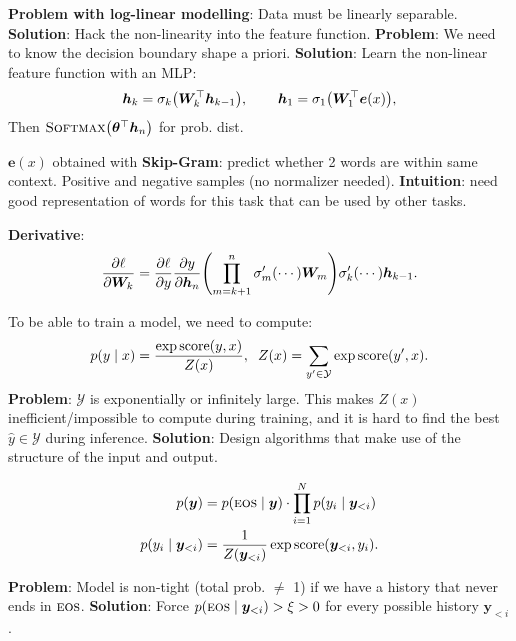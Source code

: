\documentclass{article}
\def\score{\mathrm{score}}
\def\softmax{\textsc{Softmax}}
\def\eos{\textsc{eos}}
\newcommand{\lft}{\mathopen{}\left}
\newcommand{\rgt}{\aftergroup\mathclose\aftergroup{\aftergroup}\right}
\newenvironment{topic}[1]
{\begin{tcolorbox}[
  title=#1,
  breakable,
  colback=white,
  colframe=black,
  fonttitle={\bfseries\sffamily},
  sharp corners,
  boxrule=0.5pt,
  boxsep=0.1cm,
  top=0cm,
  bottom=0cm,
  left=0.1cm,
  right=0.1cm,
  enhanced jigsaw,
]}
{\end{tcolorbox}}
\begin{document}
\begin{multicols}{3}
\begin{topic}{Multi-layer perceptron}
  \textbf{Problem with log-linear modelling}: Data must be linearly separable.
  \textbf{Solution}: Hack the non-linearity into the feature function.
  \textbf{Problem}: We need to know the decision boundary shape a priori.
  \textbf{Solution}: Learn the non-linear feature function with an MLP: \[
    \bm{h}_k = \sigma_k \lft( \bm{W}_k^\top \bm{h}_{k-1} \rgt), \hspace{0.75cm} \bm{h}_1 = \sigma_1 \lft( \bm{W}_1^\top \bm{e}(x) \rgt)
  ,\]
  Then $\softmax \lft( \bm{\theta}^\top \bm{h}_n \rgt)$ for prob. dist.

  $\bm{e}(x)$ obtained with \textbf{Skip-Gram}: predict whether 2 words are
  within same context. Positive and negative samples (no normalizer needed).
  \textbf{Intuition}: need good representation of words for this task that can be used
  by other tasks.

  \textbf{Derivative}: \[
    \pdv{\ell}{\bm{W}_k} = \pdv{\ell}{y} \pdv{y}{\bm{h}_n} \lft( \prod_{m=k+1}^n \sigma_m'(\cdots) \bm{W}_m \rgt) \sigma_k'(\cdots) \bm{h}_{k-1}
  .\]
\end{topic}

\begin{topic}{Structured prediction}
  To be able to train a model, we need to compute: \[
    p(y\mid x) = \frac{\exp \score(y, x)}{Z(x)}, \hspace{0.2cm} Z(x) = \sum_{y' \in \mathcal{Y}} \exp \score(y',x)
  .\]
  \textbf{Problem}: $\mathcal{Y}$ is exponentially or infinitely large. This
  makes $Z(x)$ inefficient/impossible to compute during training, and it is
  hard to find the best $\hat{y}\in\mathcal{Y}$ during inference.
  \textbf{Solution}: Design algorithms that make use of the structure of the
  input and output.
\end{topic}

\begin{topic}{Language modelling}
  \begin{align*}
    p(\bm{y}) &= p(\eos \mid \bm{y}) \cdot \prod_{i=1}^N p(y_i \mid \bm{y}_{<i}) \\
    p(y_i \mid \bm{y}_{<i}) &= \frac{1}{Z(\bm{y}_{<i})} \exp \score (\bm{y}_{<i}, y_i)
  .\end{align*}

  \textbf{Problem}: Model is non-tight (total prob. $\neq$ 1) if we have a
  history that never ends in $\eos$. \textbf{Solution}: Force
  $p(\eos\mid\bm{y}_{<i}) > \xi > 0$ for every possible history $\bm{y}_{<i}$.


\end{topic}
\end{multicols}
\end{document}

